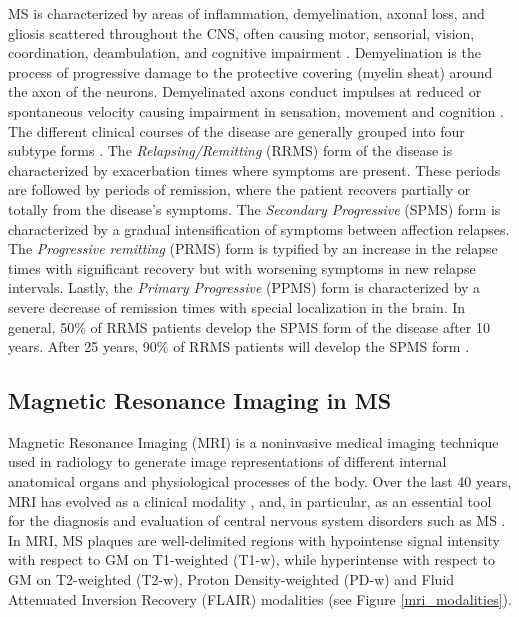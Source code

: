 MS is characterized by areas of inflammation, demyelination, axonal loss, and gliosis scattered throughout the CNS, often causing motor, sensorial, vision, coordination, deambulation, and cognitive impairment \cite{Compston2002}. Demyelination is the process of progressive damage to the protective covering (myelin sheat) around the axon of the neurons. Demyelinated axons conduct impulses at reduced or spontaneous velocity causing impairment in sensation, movement and cognition \cite{Compston2008}. The different clinical courses of the disease are generally grouped into four subtype forms \cite{Lublin1996}. The  \textit{Relapsing/Remitting} (RRMS) form of the disease is characterized by exacerbation times where symptoms are present. These periods are followed by periods of remission, where the patient recovers partially or totally from the disease's symptoms. The \textit{Secondary Progressive} (SPMS) form is characterized by a gradual intensification of symptoms between affection relapses. The \textit{Progressive remitting} (PRMS) form is typified by an increase in the relapse times with significant recovery but with worsening symptoms in new relapse intervals. Lastly, the \textit{Primary Progressive} (PPMS) form is characterized by a severe decrease of remission times with special localization in the brain. In general, 50\% of RRMS patients develop the SPMS form of the disease after 10 years. After 25 years, 90\% of RRMS patients will develop the SPMS form \cite{Lublin1996}.


\subsection{Magnetic Resonance Imaging in MS}
\label{subsec:introduction_magnetic_resonance_imaging}
Magnetic Resonance Imaging (MRI) is a noninvasive medical imaging technique  used in radiology to generate image representations of different internal anatomical organs and physiological processes of the body. Over the last 40 years, MRI has evolved as a clinical modality \cite{Geva2006}, and, in particular, as an essential tool for the diagnosis and evaluation of central nervous system disorders such as MS \cite{Edelman1993}. In MRI, MS plaques are well-delimited regions with hypointense signal intensity with respect to GM on T1-weighted (T1-w), while hyperintense with respect to GM on T2-weighted (T2-w), Proton Density-weighted (PD-w) and Fluid Attenuated Inversion Recovery (FLAIR) modalities (see Figure \ref{mri_modalities}).

